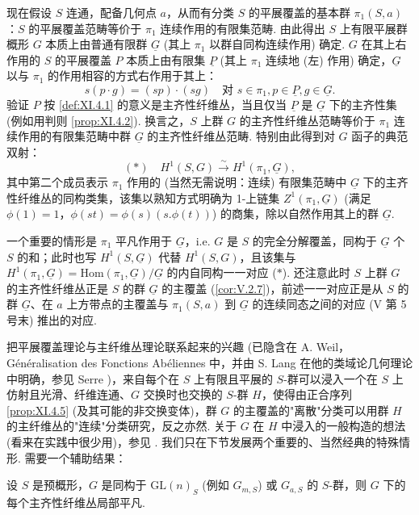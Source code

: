 现在假设 $S$ 连通，配备几何点 $a$，从而有分类 $S$ 的平展覆盖的基本群 $\pi_1(S, a)$：$S$ 的平展覆盖范畴等价于 $\pi_1$ 连续作用的有限集范畴. 由此得出 $S$ 上有限平展群概形 $G$ 本质上由普通有限群 $\underline{G}$ (其上 $\pi_1$ 以群自同构连续作用) 确定. $G$ 在其上右作用的 $S$ 的平展覆盖 $P$ 本质上由有限集 $\underline{P}$ (其上 $\pi_1$ 连续地 (左) 作用) 确定，$\underline{G}$ 以与 $\pi_1$ 的作用相容的方式右作用于其上：
\[
s(p \cdot g) = (sp) \cdot (sg) \quad \text{对 } s \in \pi_1, p \in \underline{P}, g \in \underline{G}.
\]
验证 $P$ 按 \ref{def:XI.4.1} 的意义是主齐性纤维丛，当且仅当 $\underline{P}$ 是 $\underline{G}$ 下的主齐性集 (例如用判则 \ref{prop:XI.4.2}). 换言之，$S$ 上群 $G$ 的主齐性纤维丛范畴等价于 $\pi_1$ 连续作用的有限集范畴中群 $\underline{G}$ 的主齐性纤维丛范畴. 特别由此得到对 $G$ 函子的典范双射：
\[
(\ast) \quad H^1(S, G) \xrightarrow{\sim} H^1(\pi_1, \underline{G}),
\]
其中第二个成员表示 $\pi_1$ 作用的 (当然无需说明：连续) 有限集范畴中 $\underline{G}$ 下的主齐性纤维丛的同构类集，该集以熟知方式明确为 1-上链集 $Z^1(\pi_1, \underline{G})$ (满足 $\phi(1) = 1$，$\phi(st) = \phi(s)(s.\phi(t))$) 的商集，除以自然作用其上的群 $\underline{G}$.

一个重要的情形是 $\pi_1$ 平凡作用于 $\underline{G}$，i.e. $G$ 是 $S$ 的完全分解覆盖，同构于 $\underline{G}$ 个 $S$ 的和；此时也写 $H^1(S, \underline{G})$ 代替 $H^1(S, G)$，且该集与 $H^1(\pi_1, \underline{G}) = \mathrm{Hom}(\pi_1, \underline{G})/\underline{G}$ 的内自同构一一对应 ($\ast$). 还注意此时 $S$ 上群 $G$ 的主齐性纤维丛正是 $S$ 的群 $\underline{G}$ 的主覆盖 (\cref{cor:V.2.7})，前述一一对应正是从 $S$ 的群 $\underline{G}$、在 $a$ 上方带点的主覆盖与 $\pi_1(S, a)$ 到 $\underline{G}$ 的连续同态之间的对应 (V 第 5 号末) 推出的对应.

把平展覆盖理论与主纤维丛理论联系起来的兴趣 (已隐含在 A. Weil，G\'en\'eralisation des Fonctions Ab\'eliennes 中，并由 S. Lang 在他的类域论几何理论中明确，参见 Serre \cite{exp11-5})，来自每个在 $S$ 上有限且平展的 $S$-群可以浸入一个在 $S$ 上仿射且光滑、纤维连通、$G$ 交换时也交换的 $S$-群 $H$，使得由正合序列 \ref{prop:XI.4.5} (及其可能的非交换变体)，群 $G$ 的主覆盖的"离散"分类可以用群 $H$ 的主纤维丛的"连续"分类研究，反之亦然. 关于 $G$ 在 $H$ 中浸入的一般构造的想法 (看来在实践中很少用)，参见 \cite[VI 2.8]{exp11-5}. 我们只在下节发展两个重要的、当然经典的特殊情形. 需要一个辅助结果：

\begin{proposition}\label{prop:XI.5.1}
设 $S$ 是预概形，$G$ 是同构于 $\mathrm{GL}(n)_S$ (例如 $G_{m,S}$) 或 $G_{a,S}$ 的 $S$-群，则 $G$ 下的每个主齐性纤维丛局部平凡.
\end{proposition}

